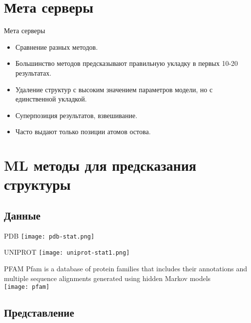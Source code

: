 \section{Мета серверы}
\begin{frame}
{Мета серверы}
	\begin{itemize}
		\item 
			 Сравнение разных  методов.
		 \item
			 Большинство методов предсказывают правильную укладку в первых 10-20 результатах.
			 \vspace{1.0cm}
		 \item
			 Удаление структур с высоким значением параметров модели, но  с единственной укладкой.
		 \item
			 Суперпозиция результатов, взвешивание.
		 \item
			 Часто выдают только позиции атомов остова.
	\end{itemize}
\end{frame}

\section{ML методы для предсказания структуры}

\subsection{Данные}

\begin{frame}{PDB}
    \centering
 \texttt{[image: pdb-stat.png]}
\end{frame}

\begin{frame}{UNIPROT}
    \centering
 \texttt{[image: uniprot-stat1.png]}
\end{frame}

\begin{frame}{PFAM}
    Pfam is a database of protein families that includes their annotations and multiple sequence alignments generated using hidden Markov models \\
    \centering
  \texttt{[image: pfam]}
\end{frame}


\subsection{Представление}


